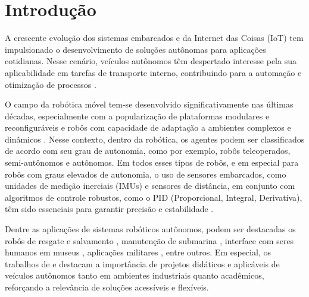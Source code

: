 \documentclass[	12pt, Times, openright, twoside, a4paper, english, brazil]{abntex2}
\begin{document}
\tableofcontents*
\cleardoublepage

\textual

\chapter{Introdução}

A crescente evolução dos sistemas embarcados e da Internet das Coisas (IoT) tem impulsionado o desenvolvimento de soluções autônomas para aplicações cotidianas. Nesse cenário, veículos autônomos têm despertado interesse pela sua aplicabilidade em tarefas de transporte interno, contribuindo para a automação e otimização de processos \cite{SCHILLINGK_FLEXIBLE_AUTONOMOUS_TRANSPORT}.

O campo da robótica móvel tem-se desenvolvido significativamente nas últimas décadas, especialmente com a popularização de plataformas modulares e reconfiguráveis \cite{MOUBARAK20121648} e robôs com capacidade de adaptação a ambientes complexos e dinâmicos \cite{SCHILLINGK_FLEXIBLE_AUTONOMOUS_TRANSPORT}. Nesse contexto, dentro da robótica, os agentes podem ser classificados de acordo com seu grau de autonomia, como por exemplo, robôs teleoperados, semi-autônomos e autônomos. Em todos esses tipos de robôs, e em especial para robôs com graus elevados de autonomia, o uso de sensores embarcados, como unidades de medição inerciais (IMUs) e sensores de distância, em conjunto com algoritmos de controle robustos, como o PID (Proporcional, Integral, Derivativa), têm sido essenciais para garantir precisão e estabilidade \cite{selfreconfigurable_cleaning_robot2020}.

Dentre as aplicações de sistemas robóticos autônomos, podem ser destacadas os robôs de resgate e salvamento \cite{calisi2007autonomous,antonios2024review}, manutenção de submarina \cite{lemos2021auv,frontiers2023underwater}, interface com seres humanos em museus \cite{cantucci2024museum,extrica2024museum}, aplicações militares \cite{hcss2021military,automate2023defense}, entre outros. Em especial, os trabalhos de \cite{nehmzow2012mobile} e \cite{SCHILLINGK_FLEXIBLE_AUTONOMOUS_TRANSPORT} destacam a importância de projetos didáticos e aplicáveis de veículos autônomos tanto em ambientes industriais quanto acadêmicos, reforçando a relevância de soluções acessíveis e flexíveis.
\end{document}
